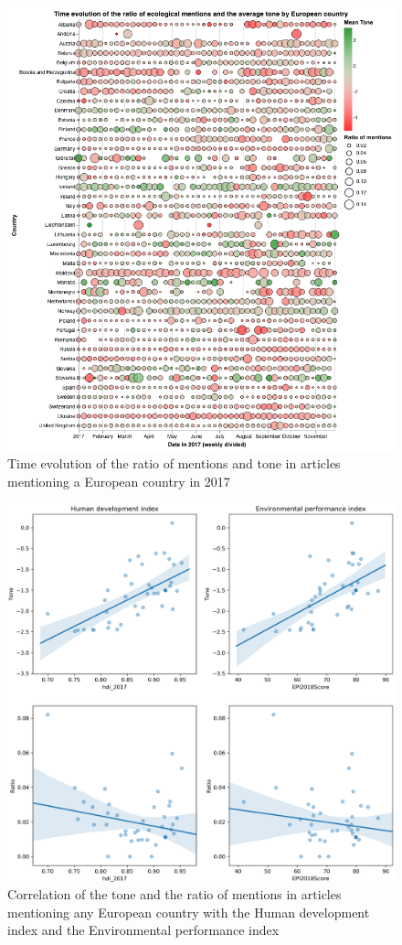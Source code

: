 \documentclass[a4paper]{article}
\begin{document}
\begin{figure}[h]
   \centering
   \includegraphics[scale=0.5]{timeline_europe_2017.png}
    \caption{\label{timeline_wide_3} Time evolution of the ratio of mentions and tone in articles mentioning a European country in 2017}
\end{figure}

\begin{figure}[h]
   \centering
   \includegraphics[scale=0.5]{corre_europe.png}
    \caption{\label{corre_wide} Correlation of the tone and the ratio of mentions in articles mentioning any European country with the Human development index and the Environmental performance index}
\end{figure}
\end{document}
